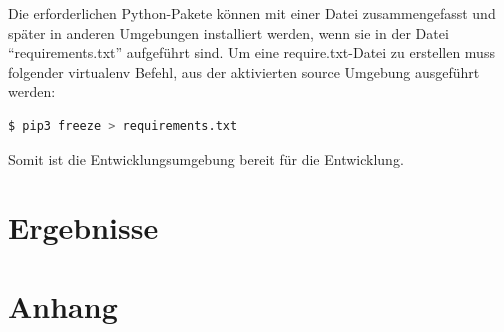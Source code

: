 \documentclass[
        ngerman,
        paper=a4,
        numbers=noendperiod,
]{scrreprt}
\begin{document}
Die erforderlichen Python-Pakete können mit einer Datei zusammengefasst und später in anderen Umgebungen installiert werden, wenn sie in der Datei \enquote{requirements.txt} aufgeführt sind. Um eine require.txt-Datei zu erstellen muss folgender virtualenv Befehl, aus der aktivierten source Umgebung ausgeführt werden:

\begin{lstlisting}[language=bash, caption=Erstellen der requirements.txt Datei]
$ pip3 freeze > requirements.txt
\end{lstlisting}

Somit ist die Entwicklungsumgebung bereit für die Entwicklung.



\chapter{Ergebnisse}










%








































\appendix 
\chapter{Anhang}
\label{chapter:Anhang}%


\clearpage
        
        
        
\end{document}
